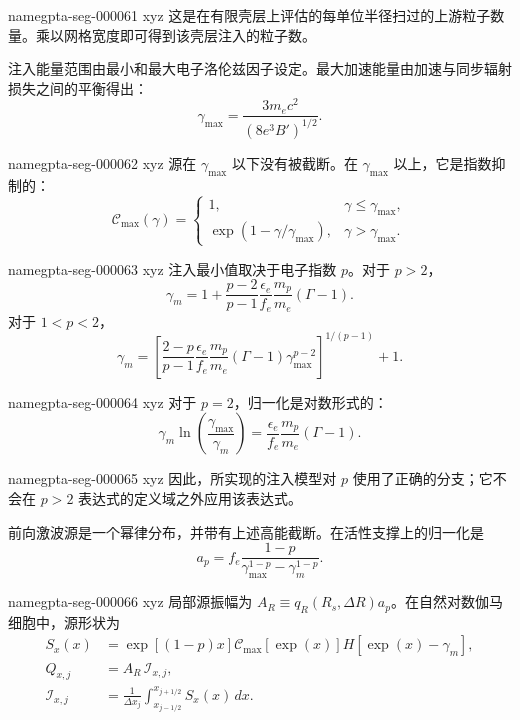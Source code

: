 \documentclass[twocolumn]{aastex702}
\makeatletter
\providecommand{\gptareaderanchor}[1]{\pdfdest name{#1} xyz}%
\providecommand{\gptareaderanchor}[1]{\special{pdf:dest (#1) [ @thispage /XYZ @xpos @ypos null ]}}%
\makeatother
\begin{document}
\gptareaderanchor{gpta-seg-000061}%
这是在有限壳层上评估的每单位半径扫过的上游粒子数量。乘以网格宽度即可得到该壳层注入的粒子数。

注入能量范围由最小和最大电子洛伦兹因子设定。最大加速能量由加速与同步辐射损失之间的平衡得出：
\begin{equation}
\gamma_{\max}=\frac{3m_ec^2}{\left(8e^3B'\right)^{1/2}} .
\end{equation}

\gptareaderanchor{gpta-seg-000062}%
源在 \(\gamma_{\max}\) 以下没有被截断。在 \(\gamma_{\max}\) 以上，它是指数抑制的：
\begin{equation}
\mathcal{C}_{\max}(\gamma)=
\begin{cases}
1, & \gamma\le\gamma_{\max},\\
\exp(1-\gamma/\gamma_{\max}), & \gamma>\gamma_{\max}.
\end{cases}
\end{equation}


\gptareaderanchor{gpta-seg-000063}%
注入最小值取决于电子指数 \(p\)。对于 \(p>2\)，
\begin{equation}
\gamma_m=1+\frac{p-2}{p-1}
\frac{\epsilon_e}{f_e}
\frac{m_p}{m_e}(\Gamma-1).
\end{equation}
对于 \(1<p<2\)，
\begin{equation}
\gamma_m=
\left[
\frac{2-p}{p-1}
\frac{\epsilon_e}{f_e}\frac{m_p}{m_e}(\Gamma-1)
\gamma_{\max}^{p-2}
\right]^{1/(p-1)}+1.
\end{equation}

\gptareaderanchor{gpta-seg-000064}%
对于 \(p=2\)，归一化是对数形式的：
\begin{equation}
\gamma_m\ln\left(\frac{\gamma_{\max}}{\gamma_m}\right)
=\frac{\epsilon_e}{f_e}\frac{m_p}{m_e}(\Gamma-1).
\end{equation}

\gptareaderanchor{gpta-seg-000065}%
因此，所实现的注入模型对 \(p\) 使用了正确的分支；它不会在 \(p>2\) 表达式的定义域之外应用该表达式。

前向激波源是一个幂律分布，并带有上述高能截断。在活性支撑上的归一化是
\begin{equation}
a_p=f_e\frac{1-p}{\gamma_{\max}^{1-p}-\gamma_m^{1-p}} .
\end{equation}

\gptareaderanchor{gpta-seg-000066}%
局部源振幅为 \(A_R\equiv q_R(R_s,\Delta R)a_p\)。在自然对数伽马细胞中，源形状为
\begin{equation}
\begin{aligned}
S_x(x)
&=\exp[(1-p)x]
\mathcal{C}_{\max}[\exp(x)]H[\exp(x)-\gamma_m],\\
Q_{x,j}
&=A_R\,\mathcal I_{x,j},\\
\mathcal I_{x,j}
&=\frac{1}{\Delta x_j}
\int_{x_{j-1/2}}^{x_{j+1/2}}
S_x(x)\,dx .
\end{aligned}
\end{equation}
\end{document}
